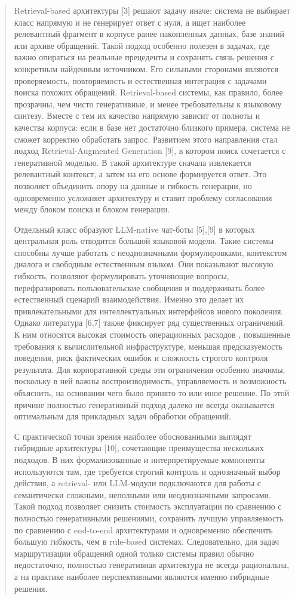 \documentclass[
]{article}
\begin{document}
\begin{quote}
Retrieval-based архитектуры {[}3{]} решают задачу иначе: система не
выбирает класс напрямую и не генерирует ответ с нуля, а ищет наиболее
релевантный фрагмент в корпусе ранее накопленных данных, базе знаний или
архиве обращений. Такой подход особенно полезен в задачах, где важно
опираться на реальные прецеденты и сохранять связь решения с конкретным
найденным источником. Его сильными сторонами являются проверяемость,
повторяемость и естественная интеграция с задачами поиска похожих
обращений. Retrieval-based системы, как правило, более прозрачны, чем
чисто генеративные, и менее требовательны к языковому синтезу. Вместе с
тем их качество напрямую зависит от полноты и качества корпуса: если в
базе нет достаточно близкого примера, система не сможет корректно
обработать запрос. Развитием этого направления стал подход
Retrieval-Augmented Generation {[}9{]}, в котором поиск сочетается с
генеративной моделью. В такой архитектуре сначала извлекается
релевантный контекст, а затем на его основе формируется ответ. Это
позволяет объединить опору на данные и гибкость генерации, но
одновременно усложняет архитектуру и ставит проблему согласования между
блоком поиска и блоком генерации.

Отдельный класс образуют LLM-native чат-боты {[}5{]},{[}9{]} в которых
центральная роль отводится большой языковой модели. Такие системы
способны лучше работать с неоднозначными формулировками, контекстом
диалога и свободным естественным языком. Они показывают высокую
гибкость, позволяют формулировать уточняющие вопросы, перефразировать
пользовательские сообщения и поддерживать более естественный сценарий
взаимодействия. Именно это делает их привлекательными для
интеллектуальных интерфейсов нового поколения. Однако литература
{[}6,7{]} также фиксирует ряд существенных ограничений. К ним относятся
высокая стоимость операционных расходов , повышенные требования к
вычислительной инфраструктуре, меньшая предсказуемость поведения, риск
фактических ошибок и сложность строгого контроля результата. Для
корпоративной среды эти ограничения особенно значимы, поскольку в ней
важны воспроизводимость, управляемость и возможность объяснить, на
основании чего было принято то или иное решение. По этой причине
полностью генеративный подход далеко не всегда оказывается оптимальным
для прикладных задач обработки обращений.

С практической точки зрения наиболее обоснованными выглядят гибридные
архитектуры {[}10{]}, сочетающие преимущества нескольких подходов. В них
формализованные и интерпретируемые компоненты используются там, где
требуется строгий контроль и однозначный выбор действия, а retrieval-
или LLM-модули подключаются для работы с семантически сложными,
неполными или неоднозначными запросами. Такой подход позволяет снизить
стоимость эксплуатации по сравнению с полностью генеративными решениями,
сохранить лучшую управляемость по сравнению с end-to-end архитектурами и
одновременно обеспечить большую гибкость, чем в rule-based системах.
Следовательно, для задач маршрутизации обращений одной только системы
правил обычно недостаточно, полностью генеративная архитектура не всегда
рациональна, а на практике наиболее перспективными являются именно
гибридные решения.
\end{quote}
\end{document}
